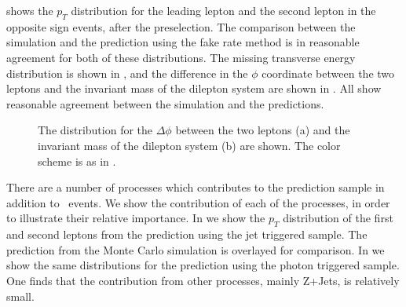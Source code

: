 \documentclass{cmspaper}
\begin{document}
\clearpage 

 shows the $p_T$ distribution for the leading lepton and the second lepton in the opposite sign events, after the preselection. The comparison between the simulation and the prediction using the fake rate method is in reasonable agreement for both of these distributions. The missing transverse energy distribution is shown in , and the difference in the $\phi$ coordinate between the two leptons and the invariant mass of the dilepton system are shown in . All show reasonable agreement between the simulation and the predictions.


\begin{figure}[htb]
\begin{center}
   \caption{The distribution for the $\Delta\phi$ between the two leptons (a) and the invariant mass of the dilepton system (b) are shown. The color  scheme is as in .}
   \label{fig:deltaphi_dileptonMass}
\end{center}
\end{figure}


There are a number of processes which contributes to the prediction sample in addition to \WPlusJets\ events. We show the contribution of each of the processes, in order to illustrate their relative importance. In  we show the $p_T$ distribution of the first and second leptons from the prediction using the jet triggered sample. The prediction from the Monte Carlo simulation is overlayed for comparison. In  we show the same distributions for the prediction using the photon triggered sample. One finds that the contribution from other processes, mainly Z+Jets, is relatively small.
\end{document}
